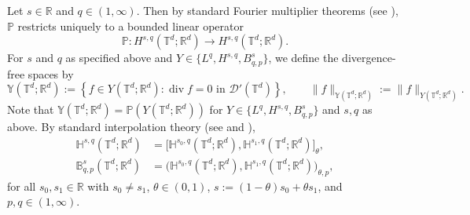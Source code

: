 \documentclass[11pt, a4paper,oneside, reqno]{amsart}
\theoremstyle{remark} %
\theoremstyle{definition} %
\numberwithin{theorem}{section}
\numberwithin{equation}{section}
\newcommand{\Hs}{\mathbb{H}}
\newcommand{\RR}{\mathbb{R}}
\newcommand{\RRd}{\RR^d}
\begin{document}
Let $s\in\mathbb{R}$ and  $q\in(1,\infty)$. Then by standard Fourier multiplier theorems
(see \cite[Theorem~5.7.11]{HNVW16}), $\mathbb{P}$ restricts uniquely to a bounded linear operator
\begin{equation*}
\mathbb{P}:
H^{s,q}(\mathbb{T}^d;\mathbb{R}^d)
\to
H^{s,q}(\mathbb{T}^d;\mathbb{R}^d)
.
\end{equation*}
For $s$ and $q$ as specified above and
$Y\in\{L^q,H^{s,q},B^s_{q,p}\}$, we define the divergence-free spaces by
\begin{equation*}
\mathbb{Y}(\mathbb{T}^d;\RRd)
:=
\left\{
f\in Y(\mathbb{T}^d;\mathbb{R}^d)
:
\operatorname{div}f=0
\text{ in }\mathscr{D}'(\mathbb{T}^d)
\right\},
\qquad
\|f\|_{\mathbb{Y}(\mathbb{T}^d;\RRd)}
:=
\|f\|_{Y(\mathbb{T}^d;\mathbb{R}^d)}.
\end{equation*}
Note that $\mathbb{Y}(\mathbb{T}^d;\RRd)
=
\mathbb{P}(Y(\mathbb{T}^d;\mathbb{R}^d))
$
for $Y\in\{L^q,H^{s,q},B^s_{q,p}\}$ and $s,q$ as above.
By standard interpolation theory
(see \cite[Section~3.6]{ST87} and \cite[Theorem~1.2.4]{Tr78}),
\begin{equation*}
\begin{aligned}
\Hs^{s,q}(\mathbb{T}^d;\RRd)
&=
\bigl[
\Hs^{s_0,q}(\mathbb{T}^d;\RRd),
\Hs^{s_1,q}(\mathbb{T}^d;\RRd)
\bigr]_\theta,
\\
\mathbb{B}^s_{q,p}(\mathbb{T}^d;\RRd)
&=
\bigl(
\Hs^{s_0,q}(\mathbb{T}^d;\RRd),
\Hs^{s_1,q}(\mathbb{T}^d;\RRd)
\bigr)_{\theta,p},
\end{aligned}
\end{equation*}
for all $s_0,s_1\in\mathbb{R}$ with $s_0\neq s_1$, $\theta\in(0,1)$, $
s:=(1-\theta)s_0+\theta s_1$, and $p,q\in(1,\infty)$.
\end{document}
